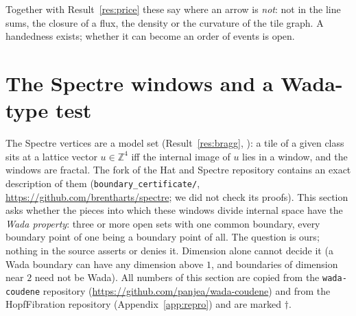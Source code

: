 \documentclass[11pt]{article}
\theoremstyle{definition}
\begin{document}
Together with Result~\ref{res:price} these say where an arrow is \emph{not}: not in the line sums, the closure of a flux, the density or the curvature of the tile graph. A handedness exists; whether it can become an order of events is open.


\section{The Spectre windows and a Wada-type test}\label{sec:wadawin}
The Spectre vertices are a model set (Result~\ref{res:bragg}, \cite{bgms}): a tile of a given class sits at a lattice vector $u\in\mathbb{Z}^4$ iff the internal image of $u$ lies in a window, and the windows are fractal. The fork of the Hat and Spectre repository contains an exact description of them (\texttt{boundary\_certificate/}, \url{https://github.com/brentharts/spectre}; we did not check its proofs). This section asks whether the pieces into which these windows divide internal space have the \emph{Wada property}: three or more open sets with one common boundary, every boundary point of one being a boundary point of all. The question is ours; nothing in the source asserts or denies it. Dimension alone cannot decide it (a Wada boundary can have any dimension above $1$, and boundaries of dimension near $2$ need not be Wada). All numbers of this section are copied from the \texttt{wada-coudene} repository (\url{https://github.com/panjea/wada-coudene}) and from the HopfFibration repository (Appendix~\ref{app:repro}) and are marked $\dagger$.
\end{document}
